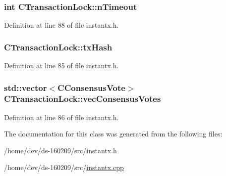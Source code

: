 \hypertarget{class_c_transaction_lock_a8c18d2530bfcea24bee8d5773d12c0a9}{}
\subsubsection[{n\+Timeout}]{\setlength{\rightskip}{0pt plus 5cm}int C\+Transaction\+Lock\+::n\+Timeout}\label{class_c_transaction_lock_a8c18d2530bfcea24bee8d5773d12c0a9}


Definition at line 88 of file instantx.\+h.

\hypertarget{class_c_transaction_lock_a9d4babccfcdf7fe3806dd3ec1b56d08a}{}
\subsubsection[{tx\+Hash}]{ C\+Transaction\+Lock\+::tx\+Hash}\label{class_c_transaction_lock_a9d4babccfcdf7fe3806dd3ec1b56d08a}


Definition at line 85 of file instantx.\+h.

\hypertarget{class_c_transaction_lock_a399f0d14a38794034c5f530599e95b3a}{}
\subsubsection[{vec\+Consensus\+Votes}]{\setlength{\rightskip}{0pt plus 5cm}std\+::vector$<${\bf C\+Consensus\+Vote}$>$ C\+Transaction\+Lock\+::vec\+Consensus\+Votes}\label{class_c_transaction_lock_a399f0d14a38794034c5f530599e95b3a}


Definition at line 86 of file instantx.\+h.



The documentation for this class was generated from the following files\+:\begin{DoxyCompactItemize}
\item 
/home/dev/ds-\/160209/src/\hyperlink{instantx_8h}{instantx.\+h}\item 
/home/dev/ds-\/160209/src/\hyperlink{instantx_8cpp}{instantx.\+cpp}\end{DoxyCompactItemize}
